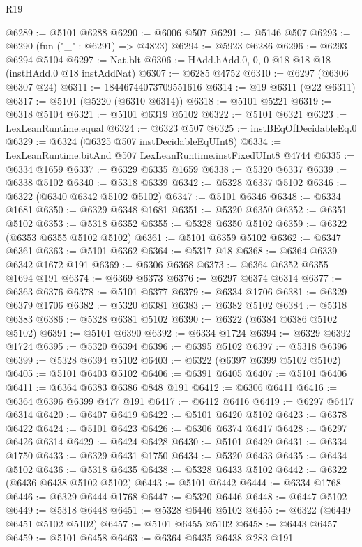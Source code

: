 \begin{lexlean}{R19}
\begin{coremodule}
{{{{{{{{{{{@6289 := @5101 @6288
@6290 := @6006 @507
@6291 := @5146 @507
@6293 := @6290 (fun ("_" : @6291) => @4823)
@6294 := @5923 @6286
@6296 := @6293 @6294 @5104
@6297 := Nat.blt
@6306 := HAdd.hAdd.{0, 0, 0} @18 @18 @18 (instHAdd.{0} @18 instAddNat)
@6307 := @6285 @4752
@6310 := @6297 (@6306 @6307 @24)
@6311 := 18446744073709551616
@6314 := @19 @6311 (@22 @6311)
@6317 := @5101 (@5220 (@6310 @6314))
@6318 := @5101 @5221
@6319 := @6318 @5104
@6321 := @5101 @6319 @5102
@6322 := @5101 @6321
@6323 := LexLeanRuntime.equal
@6324 := @6323 @507
@6325 := instBEqOfDecidableEq.{0}
@6329 := @6324 (@6325 @507 instDecidableEqUInt8)
@6334 := LexLeanRuntime.bitAnd @507 LexLeanRuntime.instFixedUInt8 @4744
@6335 := @6334 @1659
@6337 := @6329 @6335 @1659
@6338 := @5320 @6337
@6339 := @6338 @5102
@6340 := @5318 @6339
@6342 := @5328 @6337 @5102
@6346 := @6322 (@6340 @6342 @5102 @5102)
@6347 := @5101 @6346
@6348 := @6334 @1681
@6350 := @6329 @6348 @1681
@6351 := @5320 @6350
@6352 := @6351 @5102
@6353 := @5318 @6352
@6355 := @5328 @6350 @5102
@6359 := @6322 (@6353 @6355 @5102 @5102)
@6361 := @5101 @6359 @5102
@6362 := @6347 @6361
@6363 := @5101 @6362
@6364 := @5317 @18
@6368 := @6364 @6339 @6342 @1672 @191
@6369 := @6306 @6368
@6373 := @6364 @6352 @6355 @1694 @191
@6374 := @6369 @6373
@6376 := @6297 @6374 @6314
@6377 := @6363 @6376
@6378 := @5101 @6377
@6379 := @6334 @1706
@6381 := @6329 @6379 @1706
@6382 := @5320 @6381
@6383 := @6382 @5102
@6384 := @5318 @6383
@6386 := @5328 @6381 @5102
@6390 := @6322 (@6384 @6386 @5102 @5102)
@6391 := @5101 @6390
@6392 := @6334 @1724
@6394 := @6329 @6392 @1724
@6395 := @5320 @6394
@6396 := @6395 @5102
@6397 := @5318 @6396
@6399 := @5328 @6394 @5102
@6403 := @6322 (@6397 @6399 @5102 @5102)
@6405 := @5101 @6403 @5102
@6406 := @6391 @6405
@6407 := @5101 @6406
@6411 := @6364 @6383 @6386 @848 @191
@6412 := @6306 @6411
@6416 := @6364 @6396 @6399 @477 @191
@6417 := @6412 @6416
@6419 := @6297 @6417 @6314
@6420 := @6407 @6419
@6422 := @5101 @6420 @5102
@6423 := @6378 @6422
@6424 := @5101 @6423
@6426 := @6306 @6374 @6417
@6428 := @6297 @6426 @6314
@6429 := @6424 @6428
@6430 := @5101 @6429
@6431 := @6334 @1750
@6433 := @6329 @6431 @1750
@6434 := @5320 @6433
@6435 := @6434 @5102
@6436 := @5318 @6435
@6438 := @5328 @6433 @5102
@6442 := @6322 (@6436 @6438 @5102 @5102)
@6443 := @5101 @6442
@6444 := @6334 @1768
@6446 := @6329 @6444 @1768
@6447 := @5320 @6446
@6448 := @6447 @5102
@6449 := @5318 @6448
@6451 := @5328 @6446 @5102
@6455 := @6322 (@6449 @6451 @5102 @5102)
@6457 := @5101 @6455 @5102
@6458 := @6443 @6457
@6459 := @5101 @6458
@6463 := @6364 @6435 @6438 @283 @191
}}}}}}}}}}}
\end{coremodule}
\end{lexlean}
